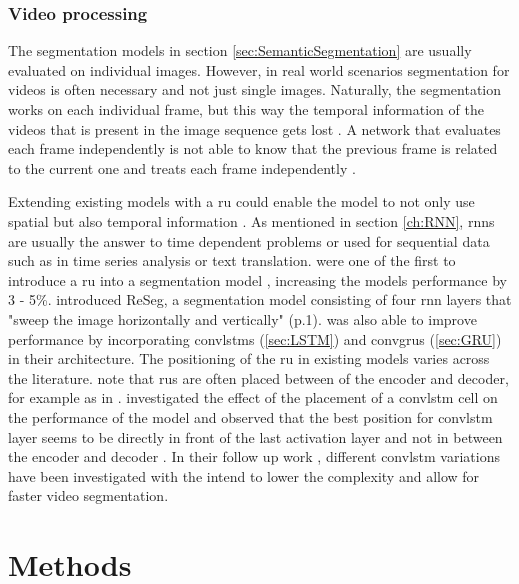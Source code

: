 \documentclass[11pt,
  paper=a4, 
  bibliography=totocnumbered,
	captions=tableheading,
	BCOR=10mm
]{scrreprt}
\theoremstyle{definition}
\begin{document}
\subsection{Video processing}

The segmentation models in section \ref{sec:SemanticSegmentation} are usually evaluated on individual images.
However, in real world scenarios segmentation for videos is often necessary and not just single images.
Naturally, the segmentation works on each individual frame, but this way the temporal information of the videos that is present in the image sequence gets lost \cite{Garcia-Garcia2018}.
A network that evaluates each frame independently is not able to know that the previous frame is related to the current one and treats each frame independently \cite{Pfeuffer2019}.

Extending existing models with a \gls{ru} could enable the model to not only use spatial but also temporal information \cite{Pfeuffer2019}.
As mentioned in section \ref{ch:RNN}, \glspl{rnn} are usually the answer to time dependent problems \cite{Hoffmann2017} or used for sequential data such as in time series analysis or text translation. 
\textcite{Valipour2017} were one of the first to introduce a \gls{ru} into a segmentation model \cite{Pfeuffer2019}, increasing the models performance by 3 - 5\%.
\textcite{Visin2015} introduced ReSeg, a segmentation model consisting of four \gls{rnn} layers that "sweep the image horizontally and vertically" (p.1).
\textcite{Yurdakul2017} was also able to improve performance by incorporating \glspl{convlstm} (\ref{sec:LSTM}) and \glspl{convgru} (\ref{sec:GRU}) in their architecture.
The positioning of the \gls{ru} in existing models varies across the literature.
\textcite{Pfeuffer2019} note that \glspl{ru} are often placed between of the encoder and decoder, for example as in \cite{Valipour2017,Yurdakul2017}.
\textcite{Pfeuffer2019} investigated the effect of the placement of a \gls{convlstm} cell on the performance of the model and observed that the best position for \gls{convlstm} layer seems to be directly in front of the last activation layer and not in between the encoder and decoder \cite{Pfeuffer2019}.
In their follow up work \cite{Pfeuffer2_2019}, different \gls{convlstm} variations have been investigated with the intend to lower the complexity and allow for faster video segmentation.

\chapter{Methods} 
\label{ch:Methods}
\end{document}
